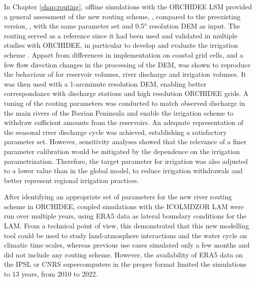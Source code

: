 In Chapter \ref{chap:routing}, offline simulations with the ORCHIDEE LSM provided a general assessment of the new routing scheme, \native, compared to the preexisting version, \std, with the same parameter set and 0.5° resolution DEM as input. The \std routing served as a reference since it had been used and validated in multiple studies with ORCHIDEE, in particular to develop and evaluate the irrigation scheme \citep{arboleda-obando_validation_2024}.
Appart from differences in implementation on coastal grid cells, and a few flow direction changes in the processing of the DEM, \native was shown to reproduce the behaviour of \std for reservoir volumes, river discharge and irrigation volumes.
It was then used with a 1-arcminute resolution DEM, enabling better correspondance with discharge stations and high resolution ORCHIDEE grids. 
A tuning of the routing parameters was conducted to match observed discharge in the main rivers of the Iberian Peninsula and enable the irrigation scheme to withdraw sufficient amounts from the reservoirs.
An adequate representation of the seasonal river discharge cycle was achieved, establishing a satisfactory parameter set. However, sensitivity analyses showed that the relevance of a finer parameter calibration would be mitigated by the dependence on the irrigation parametrization.
Therefore, the target parameter for irrigation was also adjusted to a lower value than in the global model, to reduce irrigation withdrawals and better represent regional irrigation practices.

\hfill

After identifying an appropriate set of parameters for the new river routing scheme in ORCHIDEE, coupled simulations with the ICOLMDZOR LAM were run over multiple years, using ERA5 data as lateral boundary conditions for the LAM.
From a technical point of view, this demonstrated that this new modelling tool could be used to study land-atmosphere interactions and the water cycle on climatic time scales, whereas previous use cases simulated only a few months and did not include any routing scheme.
However, the availability of ERA5 data on the IPSL or CNRS supercomputers in the proper format limited the simulations to 13 years, from 2010 to 2022. 


